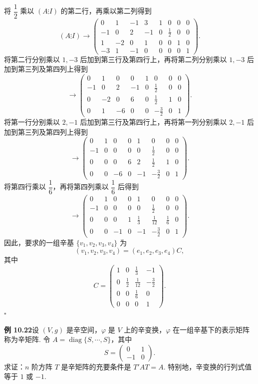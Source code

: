 \documentclass[UTF8, 12pt, fontset=fandol, oneside]{ctexart}
\begin{document}
将 $\dfrac12$ 乘以 $(A\vdots I)$ 的第二行，再乘以第二列得到
\[
(A\vdots I)\longrightarrow
\left(\begin{array}{rrrr|rrrr}
0 & 1 & -1 & 3 & 1 & 0 & 0 & 0\\
-1 & 0 & 2 & -1 & 0 & \frac12 & 0 & 0\\
1 & -2 & 0 & 1 & 0 & 0 & 1 & 0\\
-3 & 1 & -1 & 0 & 0 & 0 & 0 & 1
\end{array}\right).
\]
将第二行分别乘以 $1,-3$ 后加到第三行及第四行上，再将第二列分别乘以 $1,-3$ 后加到第三列及第四列上得到
\[
\longrightarrow
\left(\begin{array}{rrrr|rrrr}
0 & 1 & 0 & 0 & 1 & 0 & 0 & 0\\
-1 & 0 & 2 & -1 & 0 & \frac12 & 0 & 0\\
0 & -2 & 0 & 6 & 0 & \frac12 & 1 & 0\\
0 & 1 & -6 & 0 & 0 & -\frac32 & 0 & 1
\end{array}\right).
\]
将第一行分别乘以 $2,-1$ 后加到第三行及第四行上，再将第一列分别乘以 $2,-1$ 后加到第三列及第四列上得到
\[
\longrightarrow
\left(\begin{array}{rrrr|rrrr}
0 & 1 & 0 & 0 & 1 & 0 & 0 & 0\\
-1 & 0 & 0 & 0 & 0 & \frac12 & 0 & 0\\
0 & 0 & 0 & 6 & 2 & \frac12 & 1 & 0\\
0 & 0 & -6 & 0 & -1 & -\frac32 & 0 & 1
\end{array}\right).
\]
将第四行乘以 $\dfrac16$，再将第四列乘以 $\dfrac16$ 后得到
\[
\longrightarrow
\left(\begin{array}{rrrr|rrrr}
0 & 1 & 0 & 0 & 1 & 0 & 0 & 0\\
-1 & 0 & 0 & 0 & 0 & \frac12 & 0 & 0\\
0 & 0 & 0 & 1 & \frac13 & \frac1{12} & \frac16 & 0\\
0 & 0 & -1 & 0 & -1 & -\frac32 & 0 & 1
\end{array}\right).
\]
因此，要求的一组辛基 $\{v_1,v_2,v_3,v_4\}$ 为
\[
(v_1,v_2,v_3,v_4)=(e_1,e_2,e_3,e_4)C,
\]
其中
\[
C=\left(\begin{array}{rrrr}
1 & 0 & \frac13 & -1\\
0 & \frac12 & \frac1{12} & -\frac32\\
0 & 0 & \frac16 & 0\\
0 & 0 & 0 & 1
\end{array}\right).
\]
$\square$

\noindent\textbf{例 10.22}\quad 设 $(V,g)$ 是辛空间，$\varphi$ 是 $V$ 上的辛变换，$\varphi$ 在一组辛基下的表示矩阵称为辛矩阵. 令 $A=\operatorname{diag}\{S,\cdots,S\}$，其中
\[
S=\left(\begin{array}{cc}
0 & 1\\
-1 & 0
\end{array}\right).
\]
求证：$n$ 阶方阵 $T$ 是辛矩阵的充要条件是 $T'AT=A$. 特别地，辛变换的行列式值等于 $1$ 或 $-1$.
\end{document}
